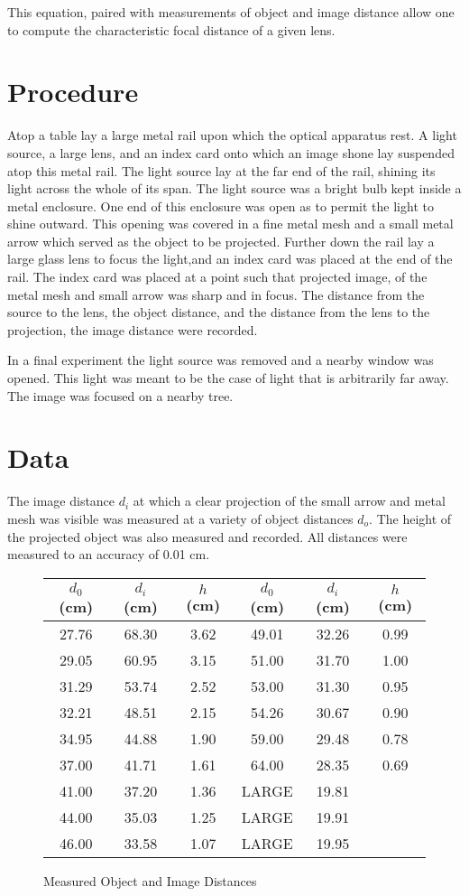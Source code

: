 \documentclass[]{article}
\begin{document}
This equation, paired with measurements of object and image distance allow one to compute the characteristic focal distance of a given lens.
\section{Procedure}
Atop a table lay a large metal rail upon which the optical apparatus rest. A light source, a large lens, and an index card onto which an image shone lay suspended atop this metal rail. The light source lay at the far end of the rail, shining its light across the whole of its span. The light source was a bright bulb kept inside a metal enclosure. One end of  this enclosure was open as to permit the light to shine outward. This opening was covered in a fine metal mesh and a small metal arrow which served as the object to be projected. Further down the rail lay a large glass lens to focus the light,and an index card was placed at the end of the rail. The index card was placed at a point such that projected image, of the metal mesh and small arrow was sharp and in focus. The distance from the source to the lens, the object distance, and the distance from the lens to the projection, the image distance were recorded.

In a final experiment the light source was removed and a nearby window was opened. This light was meant to be the case of light that is arbitrarily far away. The image was focused on a nearby tree.
\section{Data}
The image distance \(d_i\) at which a clear projection of the small arrow and metal mesh was visible was measured at a variety of object distances \(d_o\). The height of the projected object was also measured and recorded. All distances were measured to an accuracy of 0.01 cm.
\begin{figure}[h]
	\caption{Measured Object and Image Distances}
	\centering
\begin{tabular}{|c | c | c ||| c | c| c |}
	\hline
	\(d_0\) (cm) & \(d_i\) (cm) & \(h\) (cm) &  \(d_0\) (cm) & \(d_i\) (cm) & \(h\) (cm)
	\\ \hline
	27.76 & 68.30 & 3.62 & 49.01 & 32.26 & 0.99\\
	29.05 & 60.95 &	3.15 & 51.00 & 31.70 & 1.00 \\
	31.29 &	53.74 &	2.52 & 53.00 & 31.30 & 0.95\\
	32.21 &	48.51 &	2.15 & 54.26 & 30.67 & 0.90 \\
	34.95 &	44.88 &	1.90 & 59.00 & 29.48 & 0.78\\
	37.00 & 41.71 &	1.61 & 64.00 & 28.35 &0.69 \\
	41.00 & 37.20 & 1.36 & LARGE & 19.81 &    \\
    44.00 & 35.03 & 1.25 & LARGE & 19.91 & \\
	46.00 & 33.58 & 1.07 & LARGE & 19.95 & \\ \hline
	
\end{tabular}
\end{figure} 
\end{document}
